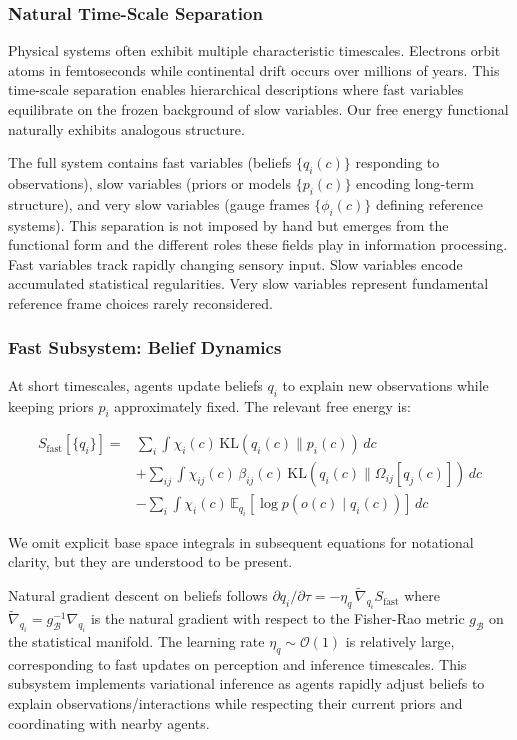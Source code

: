 \documentclass[11pt]{article}
\begin{document}
\subsubsection{Natural Time-Scale Separation}

Physical systems often exhibit multiple characteristic timescales. Electrons orbit atoms in femtoseconds while continental drift occurs over millions of years. This time-scale separation enables hierarchical descriptions where fast variables equilibrate on the frozen background of slow variables. Our free energy functional naturally exhibits analogous structure.

The full system contains fast variables (beliefs $\{q_i(c)\}$ responding to observations), slow variables (priors or models $\{p_i(c)\}$ encoding long-term structure), and very slow variables (gauge frames $\{\phi_i(c)\}$ defining reference systems). This separation is not imposed by hand but emerges from the functional form and the different roles these fields play in information processing. Fast variables track rapidly changing sensory input. Slow variables encode accumulated statistical regularities. Very slow variables represent fundamental reference frame choices rarely reconsidered.

\subsubsection{Fast Subsystem: Belief Dynamics}

At short timescales, agents update beliefs $q_i$ to explain new observations while keeping priors $p_i$ approximately fixed. The relevant free energy is:

\begin{align}
S_{\text{fast}}[\{q_i\}] = {}& \sum_i \int \chi_i(c) \, \mathrm{KL}(q_i(c) \| p_i(c)) \, dc \nonumber\\
&+ \sum_{ij} \int \chi_{ij}(c) \, \beta_{ij}(c) \, \mathrm{KL}(q_i(c) \| \Omega_{ij}[q_j(c)]) \, dc \nonumber\\
&- \sum_i \int \chi_i(c) \, \mathbb{E}_{q_i}[\log p(o(c) \mid q_i(c))] \, dc
\end{align}

We omit explicit base space integrals in subsequent equations for notational clarity, but they are understood to be present.

Natural gradient descent on beliefs follows $\partial q_i/\partial \tau = -\eta_q \, \tilde{\nabla}_{q_i} S_{\text{fast}}$ where $\tilde{\nabla}_{q_i} = g_{\mathcal{B}}^{-1} \nabla_{q_i}$ is the natural gradient with respect to the Fisher-Rao metric $g_{\mathcal{B}}$ on the statistical manifold. The learning rate $\eta_q \sim \mathcal{O}(1)$ is relatively large, corresponding to fast updates on perception and inference timescales. This subsystem implements variational inference as agents rapidly adjust beliefs to explain observations/interactions while respecting their current priors and coordinating with nearby agents.
\end{document}
